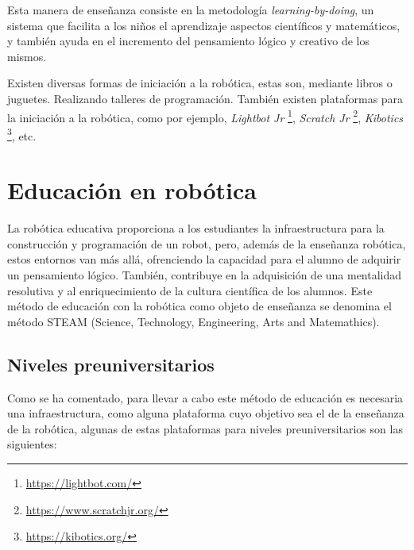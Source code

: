 \documentclass[a4paper, 12pt]{book}
\begin{document}
Esta manera de enseñanza consiste en la metodología \emph{learning-by-doing}, un sistema que facilita a los niños el aprendizaje aspectos científicos y matemáticos, y también ayuda en el incremento del pensamiento lógico y creativo de los mismos.

Existen diversas formas de iniciación a la robótica, estas son, mediante libros o juguetes. Realizando talleres de programación. También existen plataformas para la iniciación a la robótica, como por ejemplo, \emph{Lightbot Jr} \footnote{\url{https://lightbot.com/}}, \emph{Scratch Jr} \footnote{\url{https://www.scratchjr.org/}}, \emph{Kibotics} \footnote{\url{https://kibotics.org/}}, etc.

\section{Educación en robótica}
\label{sec:educacion_robotica}

La robótica educativa proporciona a los estudiantes la infraestructura para la construcción y programación de un robot, pero, además de la enseñanza robótica,
estos entornos van más allá, ofrenciendo la capacidad para el alumno de adquirir un pensamiento lógico. También, contribuye en la adquisición de una mentalidad resolutiva y al enriquecimiento de la cultura científica de los alumnos. Este método de educación con la robótica como objeto de enseñanza se denomina el método STEAM (Science, Technology, Engineering, Arts and Matemathics).

\subsection{Niveles preuniversitarios}

Como se ha comentado, para llevar a cabo este método de educación es necesaria una infraestructura, como alguna plataforma cuyo objetivo sea el de la enseñanza de la robótica, algunas de estas plataformas para niveles preuniversitarios son las siguientes:
\end{document}
